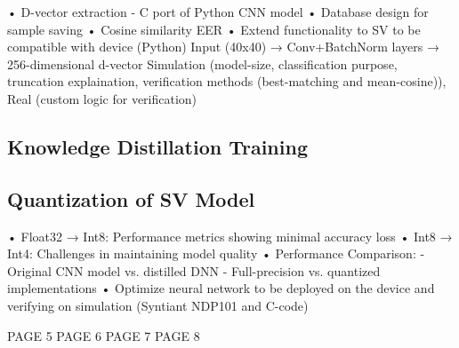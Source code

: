 • D-vector extraction - C port of Python CNN model \newline
• Database design for sample saving \newline
• Cosine similarity EER \newline
• Extend functionality to SV to be compatible with device (Python)\newline
Input (40x40) → Conv+BatchNorm layers → 256-dimensional d-vector \newline
Simulation (model-size, classification purpose, truncation explaination, verification methods (best-matching and mean-cosine)), Real (custom logic for verification)\newline

\subsection{Knowledge Distillation Training}

\subsection{Quantization of SV Model}
\label{sec:quantization}
• Float32 → Int8: Performance metrics showing minimal accuracy loss\newline
• Int8 → Int4: Challenges in maintaining model quality\newline
• Performance Comparison:\newline
    - Original CNN model vs. distilled DNN\newline
    - Full-precision vs. quantized implementations\newline
• Optimize neural network to be deployed on the device and verifying on simulation (Syntiant NDP101 and C-code)\newline\newline

\newpage
PAGE 5
\newpage
PAGE 6
\newpage 
PAGE 7
\newpage 
PAGE 8
\newpage